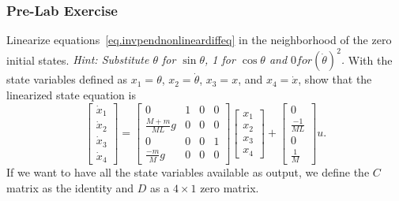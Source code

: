 \subsubsection{Pre-Lab Exercise}
Linearize equations~\eqref{eq.invpendnonlineardiffeq} in the neighborhood of the zero initial states.  \textit{Hint: Substitute $\theta$  for $\sin\theta$, 1 for $\cos\theta$ and $0 for (\dot{\theta})^2$.}  With the state variables defined as $x_1 = \theta$, $x_2 = \dot{\theta}$, $x_3 = x$, and $x_4 = \dot{x}$, show that the linearized state equation is
\begin{equation}
    \left[\begin{array}{c}
        \dot{x}_1\\
        \dot{x}_2\\
        \dot{x}_3\\
        \dot{x}_4
    \end{array}\right]
    =
    \left[\begin{array}{cccc}
        0   &   1   &   0   &   0   \\
        \frac{M+m}{ML}g&0&0 &   0   \\
        0   &   0   &   0   &   1   \\
        \frac{-m}{M}g&0&0   &   0
    \end{array}\right]
    \left[\begin{array}{c}
        x_1\\
        x_2\\
        x_3\\
        x_4
    \end{array}\right]
    +
    \left[\begin{array}{c}
        0\\
        \frac{-1}{ML}\\
        0\\
        \frac{1}{M}
    \end{array}\right]
    u.
\end{equation}
If we want to have all the state variables available as output, we define the $C$ matrix as the identity and $D$ as a $4\times1$ zero matrix.

